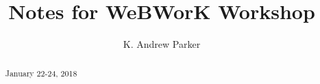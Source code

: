 \documentclass{xourse}
\title{Notes for WeBWorK Workshop}
\author{K. Andrew Parker}
\begin{document}
\begin{abstract}
January 22-24, 2018
\end{abstract}
\maketitle

\end{document}
